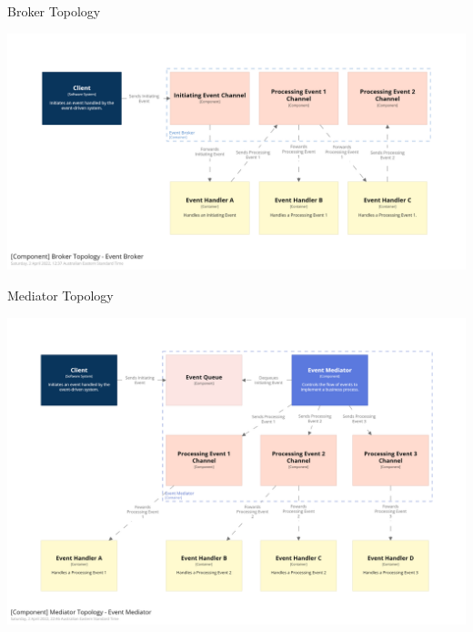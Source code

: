 \documentclass{slide}
\begin{document}
\begin{frame}{Broker Topology}
    \begin{adjustwidth}{-10mm}{-10mm}
        \centering
        \includegraphics[trim=195 195 195 195,clip,width=0.97\paperwidth]{../../notes/event/diagrams/broker-components.png}
    \end{adjustwidth}
\end{frame}


\begin{frame}{Mediator Topology}
    \begin{adjustwidth}{-10mm}{-10mm}
        \centering
        \includegraphics[trim=195 195 195 195,clip,width=1.43\paperheight]{../../notes/event/diagrams/mediator-components.png}
    \end{adjustwidth}
\end{frame}
\end{document}
